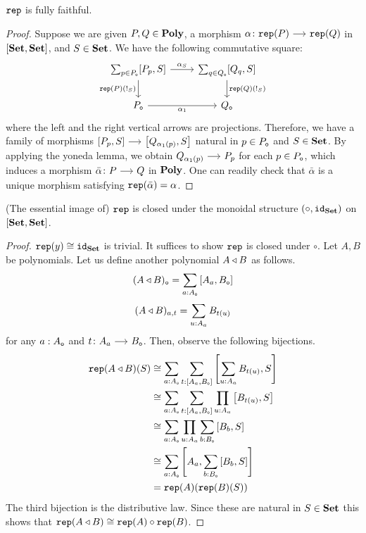 \documentclass[a4paper,dvipsnames, 11pt]{amsart}
\begin{document}
\begin{proposition}
	\label{prop:repIsFF}
	$\mathtt{rep}$ is fully faithful.
\end{proposition}
\begin{proof}
	Suppose we are given
	$P,Q\in\mathbf{Poly}$,
	a morphism $\alpha\colon\rep(P)\arr\rep(Q)$ in $\left[\mathbf{Set},\mathbf{Set}\right]$,
	and
	$S\in\mathbf{Set}$.
	We have the following commutative square:
	\[
		\begin{tikzcd}
			\sum_{p\in P_\ob}[P_p,S]
			\ar[r,"\alpha_S"]
			\ar[d,"\rep(P)(!_S)"']
				&
				\sum_{q\in Q_\ob}[Q_q,S]
				\ar[d,"\rep(Q)(!_S)"]
			\\
			P_\ob
			\ar[r,"\alpha_1"']
				&
				Q_\ob
		\end{tikzcd}
	\]
	where the left and the right vertical arrows are projections. Therefore, we have a family of morphisms
	$\left[P_p,S\right]\arr\left[Q_{\alpha_1(p)},S\right]$
	natural in $p\in P_{\mathtt{o}}$ and $S\in\mathbf{Set}$.
	By applying the yoneda lemma, we obtain $Q_{\alpha_1(p)}\arr P_p$ for each $p\in P_{\mathtt{o}}$, which induces a morphism $\bar\alpha\colon P\arr Q$ in $\mathbf{Poly}$.
	One can readily check that $\bar\alpha$ is a unique morphism satisfying $\mathtt{rep}(\bar\alpha)=\alpha$.
\end{proof}
\begin{lemma}
	\label{lem:repClosedunderMonStr}
	(The essential image of) $\mathtt{rep}$ is closed under the monoidal structure $(\circ,\mathtt{id}_{\mathbf{Set}})$ on $[\mathbf{Set},\mathbf{Set}]$.
\end{lemma}
\begin{proof}
	$\mathtt{rep}(y)\cong\mathtt{id}_{\mathbf{Set}}$ is trivial. It suffices to show $\mathtt{rep}$ is closed under $\circ$.
	Let $A,B$ be polynomials. Let us define another polynomial $A\triangleleft B$ as follows.
	\[
		(A\triangleleft B)_{\mathtt{o}}
		=\sum_{a: A_{\mathtt{o}}}\left[A_a,B_{\mathtt{o}}\right]
	\]
	\[
		(A\triangleleft B)_{a,t}
		=\sum_{u: A_a} B_{t(u)}
	\]
	for any
	$a: A_{\mathtt{o}}$ and $t\colon A_a\arr B_\ob$.
	Then, observe the following bijections.
	\begin{align*}
		\mathtt{rep}(A\triangleleft B)(S)
		&
		\cong
		\sum_{a: A_{\mathtt{o}}}\sum_{t:\left[A_a,B_{\mathtt{o}}\right]}\left[\sum_{u: A_a}B_{t(u)},S\right]
		\\
		&
		\cong
		\sum_{a: A_{\mathtt{o}}}\sum_{t:\left[A_a,B_{\mathtt{o}}\right]}\prod_{u: A_a}\left[B_{t(u)},S\right]
		\\
		&
		\cong
		\sum_{a: A_{\mathtt{o}}}\prod_{u: A_a}\sum_{b: B_{\mathtt{o}}}\left[B_{b},S\right]
		\\
		&
		\cong
		\sum_{a: A_{\mathtt{o}}}\left[A_a,\sum_{b: B_{\mathtt{o}}}\left[B_{b},S\right]\right]
		\\
		&
		=
		\mathtt{rep}(A)(\mathtt{rep}(B)(S))
	\end{align*}
	The third bijection is the distributive law.
	Since these are natural in $S\in\mathbf{Set}$ this shows that $\mathtt{rep}(A\triangleleft B)\cong\mathtt{rep}(A)\circ\mathtt{rep}(B)$.
\end{proof}
\end{document}
